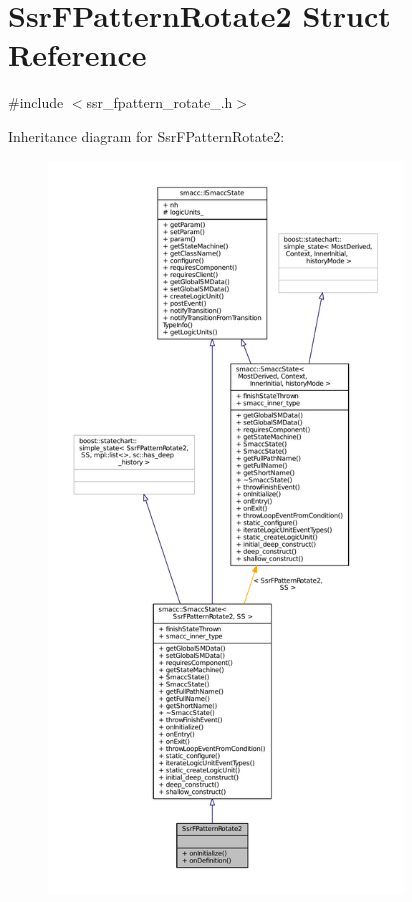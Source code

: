 \hypertarget{structSsrFPatternRotate2}{}\section{Ssr\+F\+Pattern\+Rotate2 Struct Reference}
\label{structSsrFPatternRotate2}


{\ttfamily \#include $<$ssr\+\_\+fpattern\+\_\+rotate\+\_.\+h$>$}



Inheritance diagram for Ssr\+F\+Pattern\+Rotate2\+:
\nopagebreak
\begin{figure}[H]
\begin{center}
\leavevmode
\includegraphics[height=550pt]{structSsrFPatternRotate2__inherit__graph}
\end{center}
\end{figure}


